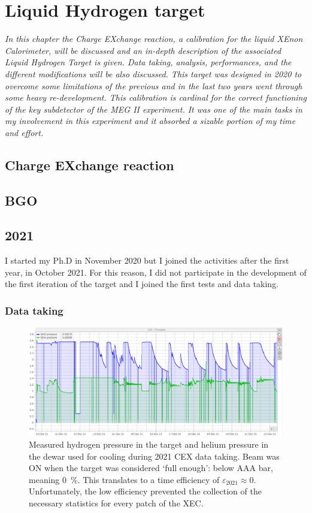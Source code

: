 \chapter{Liquid Hydrogen target}
\begin{refsection}
{\itshape In this chapter the Charge EXchange reaction, a calibration for the liquid XEnon Calorimeter, will be discussed and an in-depth description of the associated Liquid Hydrogen Target is given. 
Data taking, analysis, performances, and the different modifications will be also discussed.
This target was designed in 2020 to overcome some limitations of the previous and in the last two years went through some heavy re-development.
This calibration is cardinal for the correct functioning of the key subdetector of the MEG II experiment. It  was one of the main tasks in my involvement in this experiment and it absorbed a sizable portion of my time and effort.}

\section{Charge EXchange reaction}
\section{BGO}

\section{2021}
    I started my Ph.D in November 2020 but I joined the activities after the first year, in October 2021. For this reason, I did not participate in the development of the first iteration of the target and I joined the first tests and data taking.

    \subsection{Data taking}
        \begin{figure}
            \centering
            \includegraphics[width = \textwidth]{Figures/LH2/2021CEX_LH2.png}
            \caption{Measured hydrogen pressure in the target and helium pressure in the dewar used for cooling during 2021 CEX data taking. 
            Beam was ON when the target was considered `full enough': below AAA bar, meaning \SI{0}{\%}. 
            This translates to a time efficiency of $\varepsilon_{2021}\approx0$. 
            Unfortunately, the low efficiency prevented the collection of the necessary statistics for every patch of the XEC.}
            \label{fig:CEX2021}
        \end{figure}
    

\end{refsection}
